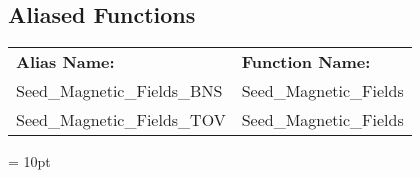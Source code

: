 \documentclass{article}
\begin{document}
\subsection*{Aliased Functions}

\hspace{5mm}

 \begin{tabular*}{160mm}{ll} 

{\bf Alias Name:} ~~~~~~~ & {\bf Function Name:} \\ 
Seed\_Magnetic\_Fields\_BNS & Seed\_Magnetic\_Fields \\ 
Seed\_Magnetic\_Fields\_TOV & Seed\_Magnetic\_Fields \\ 
\end{tabular*} 



\vspace{5mm}\parskip = 10pt 
\end{document}
